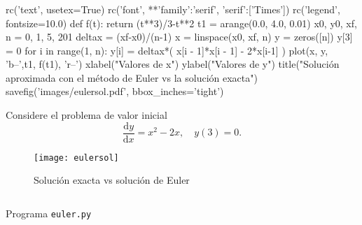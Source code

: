 
\begin{frame}[fragile]
\frametitle{\subsecname}

\begin{pylabcode}[plotsession]
rc('text', usetex=True)
rc('font', **{'family':'serif', 'serif':['Times']})
rc('legend', fontsize=10.0)
def f(t): return (t**3)/3-t**2
t1 = arange(0.0, 4.0, 0.01)
x0, y0, xf, n = 0, 1, 5, 201
deltax = (xf-x0)/(n-1)
x = linspace(x0, xf, n)
y = zeros([n])
y[3] = 0
for i in range(1, n): y[i] = deltax*( x[i - 1]*x[i - 1] - 2*x[i-1] )
plot(x, y, 'b--',t1, f(t1), 'r--')
xlabel("Valores de x")
ylabel("Valores de y")
title("Solución aproximada con el método de Euler vs la solución exacta")
savefig('images/eulersol.pdf', bbox_inches='tight')
\end{pylabcode}

\begin{minipage}{0.45\paperwidth}
\begin{example}
	Considere el problema de valor inicial \[ \frac{\mathrm{d}y}{\mathrm{d}x}=x^{2}-2x,\quad y\left(3\right)=0. \]
\end{example}
\vfill
\begin{figure}[H]
	\centering
	\texttt{[image: eulersol]}
	\caption{\label{fig:matlpotlib}Solución exacta vs solución de Euler}
\end{figure}
\end{minipage}
\hfill
\begin{minipage}{0.45\paperwidth}
		\begin{listing}[H]
		\inputminted{python}{./code/euler_01.py}
		\caption{Programa \texttt{euler.py}}
	\end{listing}
\end{minipage}
\end{frame}